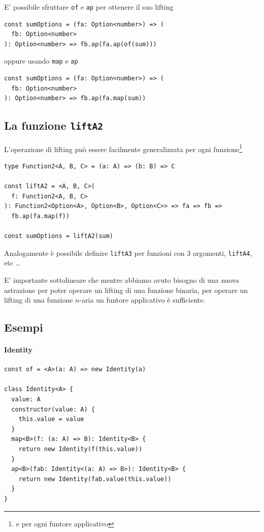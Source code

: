 \documentclass[12pt]{article}
\begin{document}
E' possibile sfruttare \texttt{of} e \texttt{ap} per ottenere il suo lifting

\begin{verbatim}
const sumOptions = (fa: Option<number>) => (
  fb: Option<number>
): Option<number> => fb.ap(fa.ap(of(sum)))
\end{verbatim}

oppure usando \texttt{map} e \texttt{ap}

\begin{verbatim}
const sumOptions = (fa: Option<number>) => (
  fb: Option<number>
): Option<number> => fb.ap(fa.map(sum))
\end{verbatim}

\subsection{La funzione \texttt{liftA2}}

L'operazione di lifting può essere facilmente generalizzata per ogni funzione\footnote{e per ogni funtore applicativo}

\begin{verbatim}
type Function2<A, B, C> = (a: A) => (b: B) => C

const liftA2 = <A, B, C>(
  f: Function2<A, B, C>
): Function2<Option<A>, Option<B>, Option<C>> => fa => fb =>
  fb.ap(fa.map(f))

const sumOptions = liftA2(sum)
\end{verbatim}

Analogamente è possibile definire \texttt{liftA3} per funzioni con 3 argomenti, \texttt{liftA4}, etc \ldots

E' importante sottolineare che mentre abbiamo avuto bisogno di una nuova astrazione per poter operare un lifting di una funzione binaria,
per operare un lifting di una funzione $n$-aria un funtore applicativo è sufficiente.

\subsection{Esempi}

\paragraph{Identity}

\begin{verbatim}
const of = <A>(a: A) => new Identity(a)

class Identity<A> {
  value: A
  constructor(value: A) {
    this.value = value
  }
  map<B>(f: (a: A) => B): Identity<B> {
    return new Identity(f(this.value))
  }
  ap<B>(fab: Identity<(a: A) => B>): Identity<B> {
    return new Identity(fab.value(this.value))
  }
}
\end{verbatim}
\end{document}
